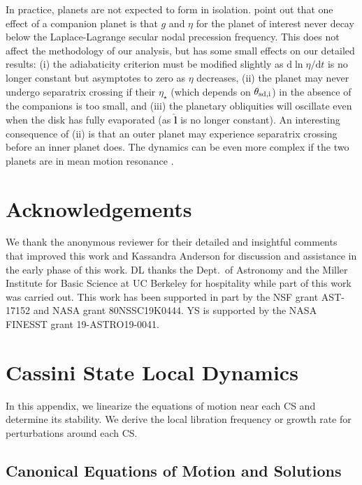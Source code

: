 \documentclass[twocolumn,twocolappendix]{aastex63}
\newcommand*{\rdil}[2]{\mathrm{d}#1 / \mathrm{d}#2}
\newcommand*{\bsmb}[1]{\boldsymbol{\mathbf{#1}}}
\newcommand*{\uv}[1]{\hat{\bsmb{#1}}}
\begin{document}
\textcolor{Corr}{In practice, planets are not expected to form in isolation.
\citet{millholland_disk} point out that one effect of a companion planet is that
$g$ and $\eta$ for the planet of interest never decay below the Laplace-Lagrange
secular nodal precession frequency. This does not affect the methodology of our
analysis, but has some small effects on our detailed results: (i) the
adiabaticity criterion must be modified slightly as $\rdil{\ln \eta}{t}$ is no
longer constant but asymptotes to zero as $\eta$ decreases, (ii) the planet may
never undergo separatrix crossing if their $\eta_{\star}$ (which depends on
$\theta_{\rm sd, i}$) in the absence of the companions is too small, and (iii)
the planetary obliquities will oscillate even when the disk has fully evaporated
(as $\uv{l}$ is no longer constant). An interesting consequence of (ii) is that
an outer planet may experience separatrix crossing before an inner planet does.
The dynamics can be even more complex if the two planets are in mean motion
resonance \citep[e.g.][]{millholland2019obliquity}.}

\section*{Acknowledgements}

We thank \textcolor{Corr}{the anonymous reviewer for their detailed and
insightful comments that improved this work and} Kassandra Anderson for
discussion and assistance in the early phase of this work. DL thanks the Dept.\
of Astronomy and the Miller Institute for Basic Science at UC Berkeley for
hospitality while part of this work was carried out. This work has been
supported in part by the NSF grant AST-17152 and NASA grant 80NSSC19K0444. YS is
supported by the NASA FINESST grant 19-ASTRO19-0041.%




\appendix

\section{Cassini State Local Dynamics}\label{s:local_dynamics}

In this appendix, we linearize the equations of motion near each CS and
determine its stability. We derive the local libration frequency or growth
rate for perturbations around each CS\@.

\subsection{Canonical Equations of Motion and Solutions}\label{ss:canonical}
\end{document}
